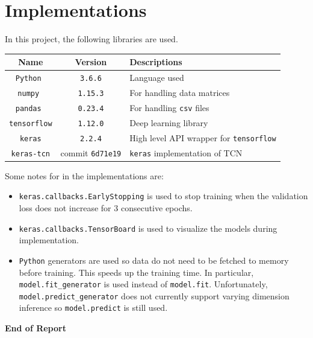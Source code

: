 \documentclass[12pt]{article}
\begin{document}
\section{Implementations}
In this project, the following libraries are used.
\begin{center}
	\begin{tabular}{ccl}
		\toprule
		Name                  & Version                 & Descriptions                                   \\\midrule
		\texttt{Python      } & \texttt{3.6.6}          & Language used                                  \\\midrule
		\texttt{numpy       } & \texttt{1.15.3}         & For handling data matrices                     \\\midrule
		\texttt{pandas      } & \texttt{0.23.4}         & For handling \texttt{csv} files                \\\midrule
		\texttt{tensorflow}   & \texttt{1.12.0}         & Deep learning library                          \\\midrule
		\texttt{keras}        & \texttt{2.2.4}          & High level API wrapper for \texttt{tensorflow} \\\midrule
		\texttt{keras-tcn}    & commit \texttt{6d71e19} & \texttt{keras} implementation of TCN           \\\bottomrule
	\end{tabular}
\end{center}
Some notes for in the implementations are:
\begin{itemize}
	\item \texttt{keras.callbacks.EarlyStopping} is used to stop training when the validation loss does not increase for \(3\) consecutive epochs.
	\item \texttt{keras.callbacks.TensorBoard} is used to visualize the models during implemen\-tation.
	\item \texttt{Python} generators are used so data do not need to be fetched to memory before training. This speeds up the training time. In particular, \texttt{model.fit\allowbreak\_generator} is used instead of \texttt{model.fit}. Unfortunately, \texttt{model.predict\_gener\-ator} does not currently support varying dimension inference so \texttt{model.predict} is still used.
\end{itemize}

\begin{center}
	\textbf{End of Report}
\end{center}
\end{document}
